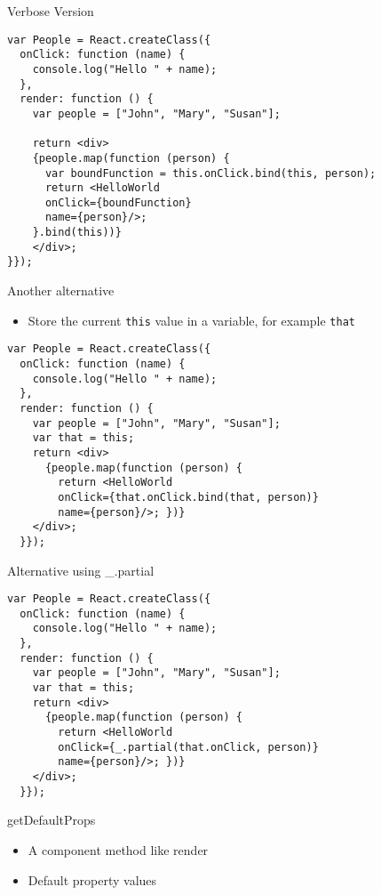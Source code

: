 \documentclass[presentation]{beamer}
\begin{document}
\begin{frame}[fragile,label={sec:orgheadline16}]{Verbose Version}
 \begin{verbatim}
var People = React.createClass({
  onClick: function (name) {
    console.log("Hello " + name);
  },
  render: function () {
    var people = ["John", "Mary", "Susan"];

    return <div>
    {people.map(function (person) {
      var boundFunction = this.onClick.bind(this, person);
      return <HelloWorld
      onClick={boundFunction}
      name={person}/>;
    }.bind(this))}
    </div>;
}});
\end{verbatim}
\end{frame}

\begin{frame}[fragile,label={sec:orgheadline17}]{Another alternative}
 \begin{itemize}
\item Store the current \texttt{this} value in a variable, for example \texttt{that}
\end{itemize}

\begin{verbatim}
var People = React.createClass({
  onClick: function (name) {
    console.log("Hello " + name);
  },
  render: function () {
    var people = ["John", "Mary", "Susan"];
    var that = this;
    return <div>
      {people.map(function (person) {
        return <HelloWorld
        onClick={that.onClick.bind(that, person)}
        name={person}/>; })}
    </div>;
  }});
\end{verbatim}
\end{frame}


\begin{frame}[fragile,label={sec:orgheadline18}]{Alternative using \_.partial}
 \begin{verbatim}
var People = React.createClass({
  onClick: function (name) {
    console.log("Hello " + name);
  },
  render: function () {
    var people = ["John", "Mary", "Susan"];
    var that = this;
    return <div>
      {people.map(function (person) {
        return <HelloWorld
        onClick={_.partial(that.onClick, person)}
        name={person}/>; })}
    </div>;
  }});
\end{verbatim}
\end{frame}

\begin{frame}[label={sec:orgheadline19}]{getDefaultProps}
\begin{itemize}
\item A component method like render
\item Default property values
\end{itemize}
\end{frame}
\end{document}
